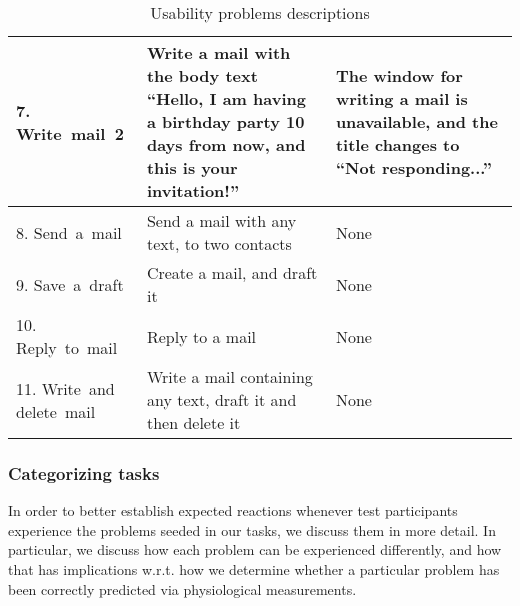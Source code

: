 \begin{table}[h]
\begin{tabular}[c]{|p{60pt}|p{80pt}|p{80pt}|}
    \small{7. Write~mail~2}           & \small{Write a mail with the body text ``Hello, I am having a birthday party 10 days from now, and this is your invitation!''} & \small{The window for writing a mail is unavailable, and the title changes to ``Not responding...''}                                                \\ \hline
    \small{8. Send~a~mail}            & \small{Send a mail with any text, to two contacts}                                                                             & \small{None}                                                                                                                                        \\ \hline
    \small{9. Save~a~draft}           & \small{Create a mail, and draft it}                                                                                            & \small{None}                                                                                                                                        \\ \hline
    \small{10. Reply~to~mail}         & \small{Reply to a mail}                                                                                                        & \small{None}                                                                                                                                        \\ \hline
    \small{11. Write~and delete~mail} & \small{Write a mail containing any text, draft it and then delete it}                                                          & \small{None}                                                                                                                                        \\ \hline
  \end{tabular}
  \caption{Usability problems descriptions}
  \label{tab:ups-desc}
\end{table}

\subsubsection{Categorizing tasks}
In order to better establish expected reactions whenever test participants experience the problems seeded in our tasks,
we discuss them in more detail. In particular, we discuss how each problem can be experienced differently, and how that
has implications w.r.t. how we determine whether a particular problem has been correctly predicted via physiological
measurements.

